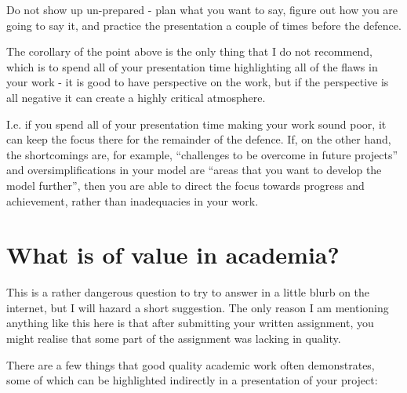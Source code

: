 \documentclass[
]{book}
\begin{document}
Do not show up un-prepared - plan what you want to say, figure out how you are going to say it, and practice the presentation a couple of times before the defence.

The corollary of the point above is the only thing that I do not recommend, which is to spend all of your presentation time highlighting all of the flaws in your work - it is good to have perspective on the work, but if the perspective is all negative it can create a highly critical atmosphere.

I.e. if you spend all of your presentation time making your work sound poor, it can keep the focus there for the remainder of the defence. If, on the other hand, the shortcomings are, for example, ``challenges to be overcome in future projects'' and oversimplifications in your model are ``areas that you want to develop the model further'', then you are able to direct the focus towards progress and achievement, rather than inadequacies in your work.

\hypertarget{what-is-of-value-in-academia}{%
\section{What is of value in academia?}\label{what-is-of-value-in-academia}}

This is a rather dangerous question to try to answer in a little blurb on the internet, but I will hazard a short suggestion. The only reason I am mentioning anything like this here is that after submitting your written assignment, you might realise that some part of the assignment was lacking in quality.

There are a few things that good quality academic work often demonstrates, some of which can be highlighted indirectly in a presentation of your project:
\end{document}
